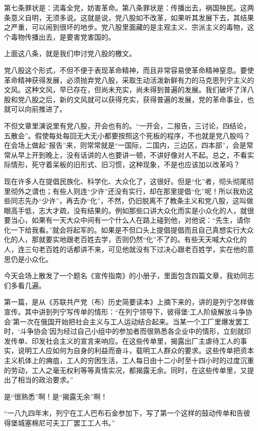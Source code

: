 第七条罪状是：流毒全党，妨害革命。第八条罪状是：传播出去，祸国殃民。这两条意义自明，无须多说。这就是说，党八股如不改革，如果听其发展下去，其结果之严重，可以闹到很坏的地步。党八股里面藏的是主观主义、宗派主义的毒物，这个毒物传播出去，是要害党害国的。

上面这八条，就是我们申讨党八股的檄文。

党八股这个形式，不但不便于表现革命精神，而且非常容易使革命精神窒息。要使革命精神获得发展，必须抛弃党八股，采取生动活泼新鲜有力的马克思列宁主义的文风。这种文风，早已存在，但尚未充实，尚未得到普遍的发展。我们破坏了洋八股和党八股之后，新的文风就可以获得充实，获得普遍的发展，党的革命事业，也就可以向前推进了。

不但文章里演说里有党八股，开会也有的。“一开会，二报告，三讨论，四结论，五散会”。假使每处每回无大无小都要按照这个死板的程序，不也就是党八股吗？在会场上做起“报告”来，则常常就是“一国际，二国内，三边区，四本部”，会是常常从早上开到晚上，没有话讲的人也要讲一顿，不讲好像对人不起。总之，不看实际情形，死守着呆板的旧形式、旧习惯，这种现象，不是也应该加以改革吗？

现在许多人在提倡民族化、科学化、大众化了，这很好。但是“化”者，彻头彻尾彻里彻外之谓也；有些人则连“少许”还没有实行，却在那里提倡“化”呢！所以我劝这些同志先办“少许”，再去办“化”，不然，仍旧脱离不了教条主义和党八股，这叫做眼高手低，志大才疏，没有结果的。例如那些口讲大众化而实是小众化的人，就很要当心，如果有一天大众中间有一个什么人在路上碰到他，对他说：“先生，请你化一下给我看。”就会将起军的。如果是不但口头上提倡提倡而且自己真想实行大众化的人，那就要实地跟老百姓去学，否则仍然“化”不了的。有些天天喊大众化的人，连三句老百姓的话都讲不来，可见他就没有下过决心跟老百姓学，实在他的意思仍是小众化。

今天会场上散发了一个题名《宣传指南》的小册子，里面包含四篇文章，我劝同志们多看几遍。

第一篇，是从《苏联共产党（布）历史简要读本》上摘下来的，讲的是列宁怎样做宣传。其中讲到列宁写传单的情形：“在列宁领导下，彼得堡‘工人阶级解放斗争协会’第一次在俄国开始把社会主义与工人运动结合起来。当某一个工厂里爆发罢工时，‘斗争协会’因为经过自己小组中的参加者而很熟悉各企业中的情形，立刻就印发传单、印发社会主义的宣言来响应。在这些传单里，揭露出厂主虐待工人的事实，说明工人应如何为自身的利益而奋斗，载明工人群众的要求。这些传单把资本主义机体上的痈疽，工人的穷困生活，工人每日由十二小时至十四小时的过度沉重的劳动，工人之毫无权利等等真情实况，都揭露无余。同时，在这些传单里，又提出了相当的政治要求。”

是“很熟悉”啊！是“揭露无余”啊！

“一八九四年末，列宁在工人巴布石金参加下，写了第一个这样的鼓动传单和告彼得堡城塞棉尼可夫工厂罢工工人书。”

